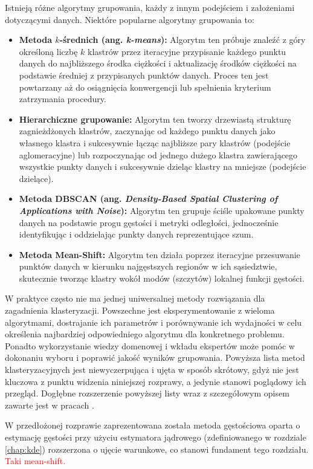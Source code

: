 \documentclass[12pt,a4paper,oneside]{book}
\theoremstyle{definition}
\begin{document}
Istnieją różne algorytmy grupowania, każdy z innym podejściem i założeniami dotyczącymi danych. Niektóre popularne algorytmy grupowania to:
\begin{itemize}
\item \textbf{Metoda $k$-średnich (ang. \textit{k-means}):} Algorytm ten próbuje znaleźć z góry określoną liczbę $k$ klastrów przez iteracyjne przypisanie każdego punktu danych do najbliższego środka ciężkości i aktualizację środków ciężkości na podstawie średniej z przypisanych punktów danych. Proces ten jest powtarzany aż do osiągnięcia konwergencji lub spełnienia kryterium zatrzymania procedury.
\item \textbf{Hierarchiczne grupowanie:} Algorytm ten tworzy drzewiastą strukturę zagnieżdżonych klastrów, zaczynając od każdego punktu danych jako własnego klastra i sukcesywnie łącząc najbliższe pary klastrów (podejście aglomeracyjne) lub rozpoczynając od jednego dużego klastra zawierającego wszystkie punkty danych i sukcesywnie dzieląc klastry na mniejsze (podejście dzielące).
\item \textbf{Metoda DBSCAN (ang. \textit{Density-Based Spatial Clustering of Applications with Noise}):} Algorytm ten grupuje ściśle upakowane punkty danych na podstawie progu gęstości i metryki odległości, jednocześnie identyfikując i oddzielając punkty danych reprezentujące szum.
\item \textbf{Metoda Mean-Shift:} Algorytm ten działa poprzez iteracyjne przesuwanie punktów danych w kierunku najgęstszych regionów w ich sąsiedztwie, skutecznie tworząc klastry wokół modów (szczytów) lokalnej funkcji gęstości.
\end{itemize}
W praktyce często nie ma jednej uniwersalnej metody rozwiązania dla zagadnienia klasteryzacji. Powszechne jest eksperymentowanie z wieloma algorytmami, dostrajanie ich parametrów i porównywanie ich wydajności w celu określenia najbardziej odpowiedniego algorytmu dla konkretnego problemu. Ponadto wykorzystanie wiedzy domenowej i wkładu ekspertów może pomóc w dokonaniu wyboru i poprawić jakość wyników grupowania. Powyższa lista metod klasteryzacyjnych jest niewyczerpująca i ujęta w sposób skrótowy, gdyż nie jest kluczowa z punktu widzenia niniejszej rozprawy, a jedynie stanowi poglądowy ich przegląd. Dogłębne rozszerzenie powyższej listy wraz z szczegółowym opisem zawarte jest w pracach \cite{Jain_1999, Xu_2005, Xu_2008}.

W przedłożonej rozprawie zaprezentowana została metoda gęstościowa oparta o estymację gęstości przy użyciu estymatora jądrowego (zdefiniowanego w rozdziale \ref{chap:kde}) rozszerzona o ujęcie warunkowe, co stanowi fundament tego rozdziału. \textcolor{red}{Taki mean-shift.}
\end{document}
